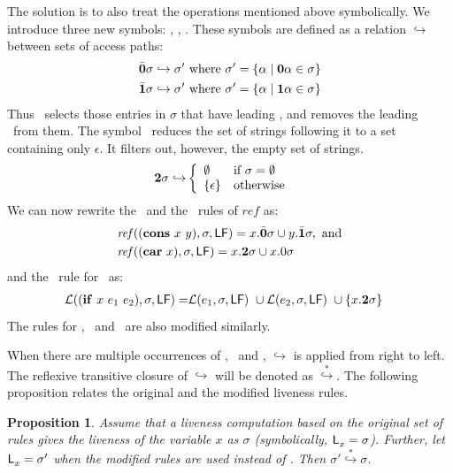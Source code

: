 \documentclass[9pt,preprint,nonatbib]{sigplanconf}
\newtheorem{proposition}[theorem]{Proposition}
\begin{document}
The solution is to  also treat the operations mentioned
above  symbolically.  We  introduce three  new symbols:
\bcar, \bcdr,  \clazy.  These symbols are  defined as a
relation  $\hookrightarrow$  between   sets  of  access
paths:
\begin{align*}
  &\bar{\mathbf{0}}\sigma \hookrightarrow \sigma' \mbox{ where } \sigma' = \{\alpha \mid \mathbf{0}\alpha \in \sigma\}\\
  &\bar{\mathbf{1}}\sigma \hookrightarrow \sigma' \mbox{ where } \sigma' = \{\alpha \mid \mathbf{1}\alpha \in \sigma\}
\end{align*}
Thus \bcar\ selects those entries in $\sigma$ that have leading \acar, and removes the leading \acar\ from them.
The symbol \clazy\ reduces the set of strings following it to a set containing only $\epsilon$. It filters out, however, the empty set of strings.
\begin{align*}
  {\mathbf{2}}\sigma \hookrightarrow & \left\{ 
  \begin{array}{ll}
    \emptyset&\mbox{if}~\sigma = \emptyset\\
    \{\epsilon\} & \mbox{otherwise}
  \end{array}\right.
\end{align*}
We can  now rewrite the \CONS\  and the \CAR\  rules of $\mathit{ref}$
as:
\begin{align*}
&\mathit{ref\/}((\mbox{$\mathbf{cons}$}~x~y),\sigma,\mathsf{LF})
= x.\bar{\mathbf{0}}\sigma \cup y.\bar{\mathbf{1}}\sigma  \label{eqn:mod-cons},~
\mbox{and} \\
&\mathit{ref\/}((\mbox{$\mathbf{car}$}~x),\sigma,\mathsf{LF})
          =   x.{\mathbf{2}}\sigma \cup x.0\sigma
\end{align*}
and the \Lfunonly\ rule
for \SIF\ as:
\begin{align*}
\mathcal{L}((\mbox{$\mathbf{ if}$}~x~e_1~e_2),\sigma,\mathsf{LF}) =
                    &\mathcal{L}(e_1,\sigma,\mathsf{LF})~\cup
        \mathcal{L}(e_2,\sigma,\mathsf{LF})~\cup
          \{x.{\mathbf{2}} \sigma\}
\end{align*}
The rules for  \CDR, \PRIM\ and \NULLQ\ are also
modified similarly.


When   there  are   multiple   occurrences  of   \bcar,
\bcdr\  and \clazy,  $\hookrightarrow$ is  applied from
right  to left.   The reflexive  transitive closure  of
$\hookrightarrow$      will      be     denoted      as
$\stackrel{*}{\hookrightarrow}$.      The     following
proposition  relates  the  original  and  the  modified
liveness rules. 
\begin{proposition}
Assume  that  a  liveness   computation  based  on  the
original  set  of  rules  gives  the  liveness  of  the
variable  $x$   as $\sigma$
(symbolically,  $\mathsf{L}_{{x}}^{}=  \sigma$).  Further,  let
$\mathsf{L}_{{x}}^{}= \sigma'$ when the modified rules are used
instead      of      \Lfunonly.      Then      $\sigma'
\stackrel{*}{\hookrightarrow} \sigma$.
\end{proposition}
\end{document}
